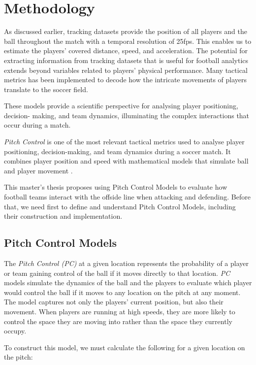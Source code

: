 \documentclass[
  twoside,nohyper]{book}
\begin{document}
\chapter{Methodology}\label{methodology}

As discussed earlier, tracking datasets provide the position of all players and the ball throughout the match with a temporal resolution of 25fps. This enables us to estimate the players' covered distance, speed, and acceleration. The potential for extracting information from tracking datasets that is useful for football analytics extends beyond variables related to players' physical performance. Many tactical metrics has been implemented to decode how the intricate movements of players translate to the soccer field.

These models provide a scientific perspective for analysing player positioning, decision-
making, and team dynamics, illuminating the complex interactions that occur during a
match.

\emph{Pitch Control} is one of the most relevant tactical metrics used to analyse player positioning, decision-making, and team dynamics during a soccer match. It combines player position and speed with mathematical models that simulate ball and player movement \citep{Spearman}.

This master's thesis proposes using Pitch Control Models to evaluate how football teams interact with the offside line when attacking and defending. Before that, we need first to define and understand Pitch Control Models, including their construction and implementation.

\section{Pitch Control Models}\label{pitch-control-models}

The \emph{Pitch Control (PC)} at a given location represents the probability of a player or team gaining control of the ball if it moves directly to that location. \emph{PC} models simulate the dynamics of the ball and the players to evaluate which player would control the ball if it moves to any location on the pitch at any moment.
The model captures not only the players' current position, but also their movement. When players are running at high speeds, they are more likely to control
the space they are moving into rather than the space they currently occupy.

To construct this model, we must calculate the following for a given location on the pitch:
\end{document}
